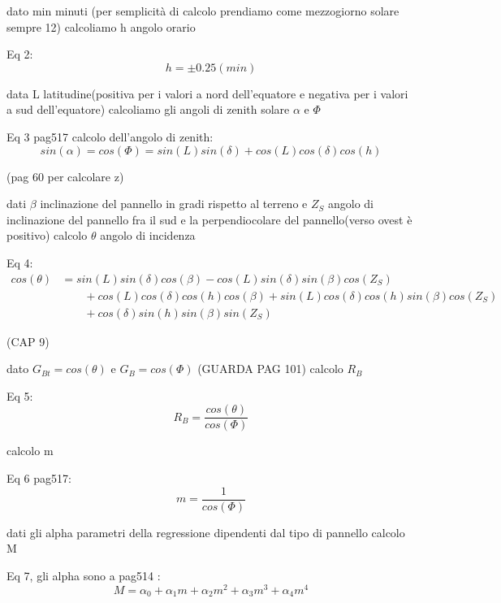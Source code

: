 \documentclass{article}
\begin{document}
dato min minuti (per semplicità di calcolo prendiamo come mezzogiorno solare sempre 12) calcoliamo h angolo orario

Eq 2:
\begin{equation}
    h=\pm 0.25(min)
\end{equation}

data L latitudine(positiva per i valori a nord dell'equatore e negativa per i valori a sud dell'equatore) calcoliamo gli angoli di zenith solare $\alpha$ e $\Phi$

Eq 3 pag517 calcolo dell'angolo di zenith:
\begin{equation}
    sin(\alpha)=cos(\Phi)=sin(L)sin(\delta)+cos(L)cos(\delta)cos(h)
\end{equation}

(pag 60 per calcolare z)

dati $\beta$ inclinazione del pannello in gradi rispetto al terreno e $Z_{S}$ angolo di inclinazione del pannello fra il sud e la perpendiocolare del pannello(verso ovest è positivo) calcolo $\theta$ angolo di incidenza

Eq 4:
\begin{equation} \begin{split}
    cos(\theta)&=sin(L)sin(\delta)cos(\beta)-cos(L)sin(\delta)sin(\beta)cos(Z_{S}) \\
    &\qquad +cos(L)cos(\delta)cos(h)cos(\beta)+sin(L)cos(\delta)cos(h)sin(\beta)cos(Z_{S}) \\
    &\qquad +cos(\delta)sin(h)sin(\beta)sin(Z_{S})
\end{split}\end{equation}

(CAP 9)

dato $G_{Bt}=cos(\theta) $ e $G_{B}=cos(\Phi)$ (GUARDA PAG 101) calcolo $R_{B}$

Eq 5:
\begin{equation}
    R_{B}=\frac{cos(\theta)}{cos(\Phi)}
\end{equation}

calcolo m

Eq 6 pag517:
\begin{equation}
   m=\frac{1}{cos(\Phi)}
\end{equation}

dati gli alpha parametri della regressione dipendenti dal tipo di pannello calcolo M

Eq 7, gli alpha sono a pag514 : 
\begin{equation}
    M=\alpha_{0}+\alpha_{1}m+\alpha_{2}m^2+\alpha_{3}m^3+\alpha_{4}m^4
\end{equation}
\end{document}
